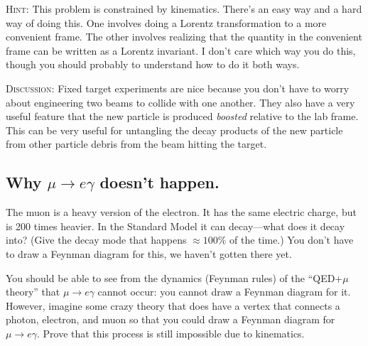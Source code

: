 \documentclass[12pt]{article}
\numberwithin{equation}{section}    %
\begin{document}
\textsc{Hint}: This problem is constrained by kinematics. There's an easy way and a hard way of doing this. One involves doing a Lorentz transformation to a more convenient frame. The other involves realizing that the quantity in the convenient frame can be written as a Lorentz invariant. I don't care which way you do this, though you should probably to understand how to do it both ways. 

\textsc{Discussion}: Fixed target experiments are nice because you don't have to worry about engineering two beams to collide with one another. They also have a very useful feature that the new particle is produced \emph{boosted} relative to the lab frame. This can be very useful for untangling the decay products of the new particle from other  particle debris from the beam hitting the target.


%
%





\subsection{Why $\mu \to e \gamma$ doesn't happen.}

The muon is a heavy version of the electron. It has the same electric charge, but is 200 times heavier. In the Standard Model it can decay---what does it decay into? (Give the decay mode that happens $\approx 100\%$ of the time.) You don't have to draw a Feynman diagram for this, we haven't gotten there yet.

You should be able to see from the dynamics (Feynman rules) of the ``QED+$\mu$ theory'' that $\mu \to e \gamma$ cannot occur: you cannot draw a Feynman diagram for it. However, imagine some crazy theory that does have a vertex that connects a photon, electron, and muon so that you could draw a Feynman diagram for $\mu\to e \gamma$. Prove that this process is still impossible due to kinematics. 
\end{document}
